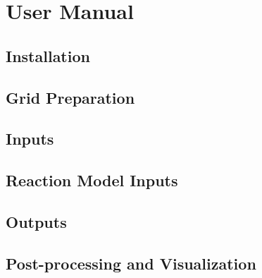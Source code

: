 \section{User Manual}

\subsection{Installation}

\subsection{Grid Preparation}

\subsection{Inputs}

\subsection{Reaction Model Inputs}

\subsection{Outputs}

\subsection{Post-processing and Visualization}

